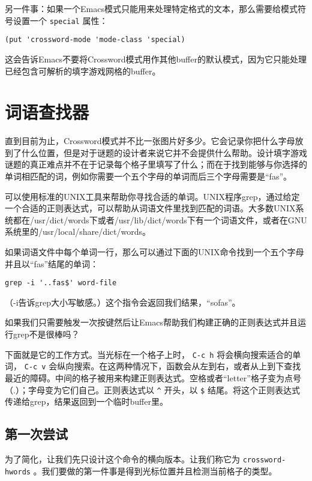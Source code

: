 另一件事：如果一个Emacs模式只能用来处理特定格式的文本，那么需要给模式符号设置一个 \texttt{special} 属性：

\begin{verbatim}
(put 'crossword-mode 'mode-class 'special)
\end{verbatim}

这会告诉Emacs不要将Crossword模式用作其他buffer的默认模式，因为它只能处理已经包含可解析的填字游戏网格的buffer。

\section{词语查找器}
\label{section:10-Word-Finder}

直到目前为止，Crossword模式并不比一张图片好多少。它会记录你把什么字母放到了什么位置，但是对于谜题的设计者来说它并不会提供什么帮助。设计填字游戏谜题的真正难点并不在于记录每个格子里填写了什么；而在于找到能够与你选择的单词相匹配的词，例如你需要一个五个字母的单词而后三个字母需要是“fas”。

可以使用标准的UNIX工具来帮助你寻找合适的单词。UNIX程序grep，通过给定一个合适的正则表达式，可以帮助从词语文件里找到匹配的词语。大多数UNIX系统都在/usr/dict/words下或者/usr/lib/dict/words下有一个词语文件，或者在GNU系统里的/usr/local/share/dict/words。

如果词语文件中每个单词一行，那么可以通过下面的UNIX命令找到一个五个字母并且以“fas”结尾的单词：

\begin{verbatim}
grep -i '..fas$' word-file
\end{verbatim}

（-i告诉grep大小写敏感。）这个指令会返回我们结果，“sofas”。

如果我们只需要触发一次按键然后让Emacs帮助我们构建正确的正则表达式并且运行grep不是很棒吗？

下面就是它的工作方式。当光标在一个格子上时， \verb|C-c h| 将会横向搜索适合的单词， \verb|C-c v| 会纵向搜索。在这两种情况下，函数会从左到右，或者从上到下查找最近的障碍。中间的格子被用来构建正则表达式。空格或者“letter”格子变为点号（.）；字母变为它们自己。正则表达式以 \verb|^| 开头，以 \verb|$| 结尾。将这个正则表达式传递给grep，结果返回到一个临时buffer里。

\subsection{第一次尝试}
\label{section:10-First-Try}

为了简化，让我们先只设计这个命令的横向版本。让我们称它为 \texttt{crossword-hwords} 。我们要做的第一件事是得到光标位置并且检测当前格子的类型。

